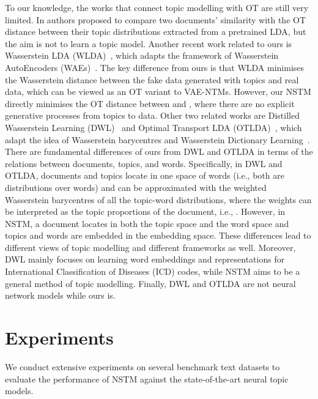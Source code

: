 \documentclass{article}
\begin{document}
To our knowledge, the works that connect topic modelling with OT are still very limited.
In \cite{yurochkin2019hierarchical} authors proposed to compare two documents' similarity with the OT distance between their topic distributions extracted from a pretrained LDA, but the aim is not to learn a topic model.
Another recent work related to ours is Wasserstein LDA (WLDA)~\citep{nan2019topic}, which adapts the framework of Wasserstein AutoEncoders (WAEs)~\citep{tolstikhin2017wasserstein}.
The key difference from ours is that WLDA minimises the Wasserstein distance between the fake data generated with topics and real data, which can be viewed as an OT variant to VAE-NTMs.
However, our NSTM directly minimises the OT distance between  and , where there are no explicit generative processes from topics to data. Other two related works are Distilled Wasserstein Learning (DWL)~\citep{xu2018distilled} and Optimal Transport LDA (OTLDA)~\citep{huynh2020otlda}, which adapt the idea of Wasserstein barycentres and Wasserstein Dictionary Learning~\citep{rolet2016fast,schmitz2018wasserstein}. 
There are fundamental differences of ours from DWL and OTLDA in terms of the relations between documents, topics, and words. Specifically, 
in DWL and OTLDA, documents and topics locate in one space of words (i.e., both are distributions over words) and  can be approximated with the weighted Wasserstein barycentres of all the topic-word distributions, where the weights can be interpreted as the topic proportions of the document, i.e., .
However, in NSTM, a document locates in both the topic space and the word space and topics and words are embedded in the embedding space.
These differences lead to different views of topic modelling and different frameworks as well. Moreover, DWL mainly focuses on learning word embeddings and representations for International Classification of Diseases (ICD) codes, while NSTM aims to be a general method of topic modelling. Finally, DWL and OTLDA are not neural network models while ours is.





\section{Experiments}

We conduct extensive experiments on several benchmark text datasets to evaluate the performance of NSTM against the state-of-the-art neural topic models.
\end{document}
